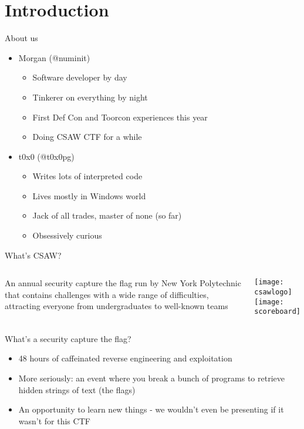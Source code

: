 
\section{Introduction}

\begin{frame}{About us}
    \begin{itemize}
        \item Morgan (@numinit)
        \begin{itemize}
            \item Software developer by day
            \item Tinkerer on everything by night
            \item First Def Con and Toorcon experiences this year
            \item Doing CSAW CTF for a while
        \end{itemize}
        \item t0x0 (@t0x0pg)
        \begin{itemize}
            \item Writes lots of interpreted code
            \item Lives mostly in Windows world
            \item Jack of all trades, master of none (so far)
            \item Obsessively curious
        \end{itemize}
    \end{itemize}
\end{frame}

\begin{frame}{What's CSAW?}
    \begin{columns}
        An annual security capture the flag run by New York Polytechnic that
        contains challenges with a \alert{wide range of difficulties},
        attracting everyone from undergraduates to well-known teams

        \texttt{[image: csawlogo]} \\
        \texttt{[image: scoreboard]}
    \end{columns}
\end{frame}

\begin{frame}{What's a security capture the flag?}
    \begin{itemize}
        \item<1-> 48 hours of caffeinated reverse engineering and exploitation
        \item<2-> More seriously: an event where you break a bunch of programs
                  to retrieve hidden strings of text (the flags)
        \item<3-> An opportunity to learn new things - we wouldn't
                  even be presenting if it wasn't for this CTF
    \end{itemize}
\end{frame}

